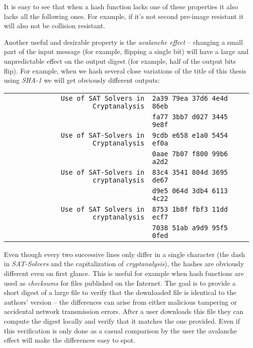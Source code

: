 It is easy to see that when a hash function lacks one of these properties it also lacks all the following ones.
For example, if it's not second pre-image resistant it will also not be collision resistant.

Another useful and desirable property is the \emph{avalanche effect} -- changing a small part of the input message (for example, flipping a single bit) will have a large and unpredictable effect on the output digest (for example, half of the output bits flip).
For example, when we hash several close variations of the title of this thesis using \emph{SHA-1} we will get obviously different outputs:

\begin{tabular}{r l}
\texttt{Use of SAT Solvers in Cryptanalysis} & \texttt{2a39 79ea 37d6 4e4d 86eb} \\
& \texttt{fa77 3bb7 d027 3445 9e8f} \\
\texttt{Use of SAT-Solvers in Cryptanalysis} & \texttt{9cdb e658 e1a0 5454 ef0a}\\
& \texttt{0aae 7b07 f800 99b6 a2d2} \\
\texttt{Use of SAT-Solvers in cryptanalysis} & \texttt{83c4 3541 804d 3695 de67}\\
& \texttt{d9e5 064d 3db4 6113 4c22} \\
\texttt{Use of SAT Solvers in cryptanalysis} & \texttt{8753 1b8f fbf3 11dd ecf7} \\
& \texttt{7038 51ab a9d9 95f5 0fed}
\end{tabular}

Even though every two successive lines only differ in a single character (the dash in \emph{SAT-Solvers} and the capitalization of \emph{cryptanalysis}), the hashes are obviously different even on first glance.
This is useful for example when hash functions are used as \emph{checksums} for files published on the Internet.
The goal is to provide a short digest of a large file to verify that the downloaded file is identical to the authors' version -- the differences can arise from either malicious tampering or accidental network transmission errors.
After a user downloads this file they can compute the digest locally and verify that it matches the one provided.
Even if this verification is only done as a casual comparison by the user the avalanche effect will make the differences easy to spot.


